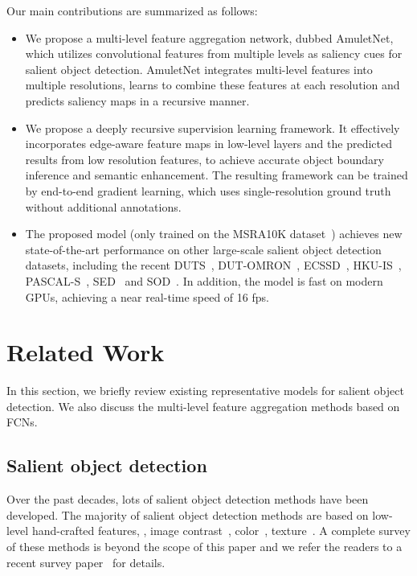 \documentclass[10pt,twocolumn,letterpaper]{article}
\begin{document}
Our main contributions are summarized as follows:
\begin{itemize}
\vspace{-2mm}
 \item
We propose a multi-level feature aggregation network, dubbed AmuletNet, which utilizes convolutional features from multiple levels as saliency cues for salient object detection.
%
AmuletNet integrates multi-level features into multiple resolutions, learns to combine these features at each resolution and predicts saliency maps in a recursive manner.
\vspace{-2mm}
 \item
We propose a deeply recursive supervision learning framework. It effectively incorporates edge-aware feature maps in low-level layers and the predicted results from low resolution features, to achieve accurate object boundary inference and semantic enhancement.
%
The resulting framework can be trained by end-to-end gradient learning, which uses single-resolution ground truth without additional annotations.
 \vspace{-2mm}
\item
The proposed model (only trained on the MSRA10K dataset~\cite{ChengPAMI}) achieves new state-of-the-art performance on other large-scale salient object detection datasets, including the recent DUTS~\cite{Wang2017CVPR}, DUT-OMRON~\cite{yang2013saliency}, ECSSD~\cite{yan2013hierarchical}, HKU-IS~\cite{zhao2015saliency}, PASCAL-S~\cite{li2014secrets}, SED~\cite{borj2015salient} and SOD~\cite{yan2013hierarchical}.
%
In addition, the model is fast on modern GPUs, achieving a near real-time speed of 16 fps.
\end{itemize}

\section{Related Work}
In this section, we briefly review existing representative models for salient object detection.
%
We also discuss the multi-level feature aggregation methods based on FCNs.
\subsection{Salient object detection}
Over the past decades, lots of salient object detection methods have been developed.
%
The majority of salient object detection methods are based on low-level hand-crafted features, \eg, image contrast~\cite{Federico12,jiang2013salient}, color~\cite{li2014secrets,borj2015salient}, texture~\cite{yan2013hierarchical,yang2013saliency}.
%
A complete survey of these methods is beyond the scope of this paper and we refer the readers to a recent survey paper~\cite{borji2015salient} for details.
%
\end{document}
